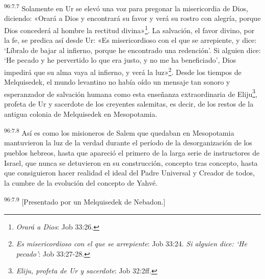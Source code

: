 \par
\textsuperscript{96:7.7} Solamente en Ur se elevó una voz para pregonar la misericordia de Dios, diciendo: «Orará a Dios y encontrará su favor y verá su rostro con alegría, porque Dios concederá al hombre la rectitud divina»\footnote{\textit{Orará a Dios}: Job 33:26.}. La salvación, el favor divino, por la fe, se predica así desde Ur: «Es misericordioso con el que se arrepiente, y dice: `Líbralo de bajar al infierno, porque he encontrado una redención'. Si alguien dice: `He pecado y he pervertido lo que era justo, y no me ha beneficiado', Dios impedirá que su alma vaya al infierno, y verá la luz»\footnote{\textit{Es misericordioso con el que se arrepiente}: Job 33:24. \textit{Si alguien dice: `He pecado'}: Job 33:27-28.}. Desde los tiempos de Melquisedek, el mundo levantino no había oído un mensaje tan sonoro y esperanzador de salvación humana como esta enseñanza extraordinaria de Eliju\footnote{\textit{Eliju, profeta de Ur y sacerdote}: Job 32:2ff.}, profeta de Ur y sacerdote de los creyentes salemitas, es decir, de los restos de la antigua colonia de Melquisedek en Mesopotamia.

\par
\textsuperscript{96:7.8} Así es como los misioneros de Salem que quedaban en Mesopotamia mantuvieron la luz de la verdad durante el período de la desorganización de los pueblos hebreos, hasta que apareció el primero de la larga serie de instructores de Israel, que nunca se detuvieron en su construcción, concepto tras concepto, hasta que consiguieron hacer realidad el ideal del Padre Universal y Creador de todos, la cumbre de la evolución del concepto de Yahvé.

\par
\textsuperscript{96:7.9} [Presentado por un Melquisedek de Nebadon.]